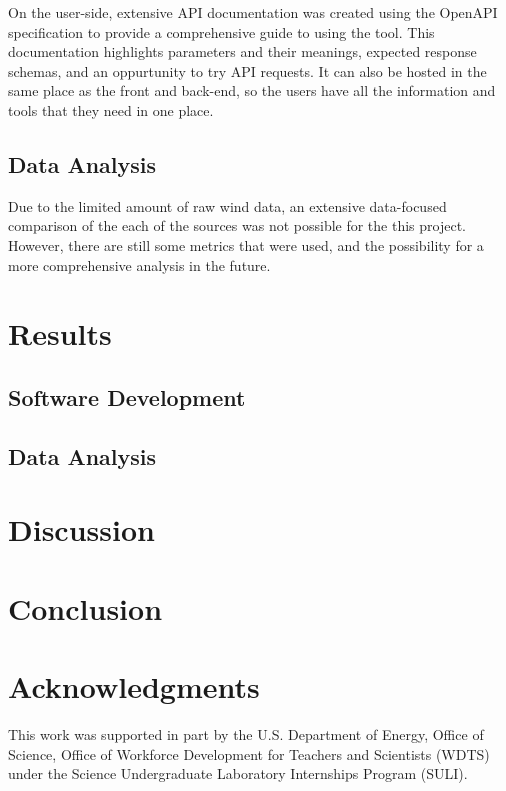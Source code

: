 \documentclass[12pt, oneside]{article}   	%
\begin{document}
On the user-side, extensive API documentation was created using the OpenAPI
specification to provide a comprehensive guide to using the tool. This
documentation highlights parameters and their meanings, expected response
schemas, and an oppurtunity to try API requests. It can also be hosted in the
same place as the front and back-end, so the users have all the information and
tools that they need in one place.
\subsection{Data Analysis}
Due to the limited amount of raw wind data, an extensive data-focused comparison of the each of the sources was not possible for the this project. However, there are still some metrics that were used, and the possibility for a more comprehensive analysis in the future.

\section{Results}
\subsection{Software Development}
\subsection{Data Analysis}
\section{Discussion}
\section{Conclusion}
\section{Acknowledgments}

This work was supported in part by the U.S. Department of Energy, Office of
Science, Office of Workforce Development for Teachers and Scientists (WDTS)
under the Science Undergraduate Laboratory Internships Program (SULI).
\end{document}

